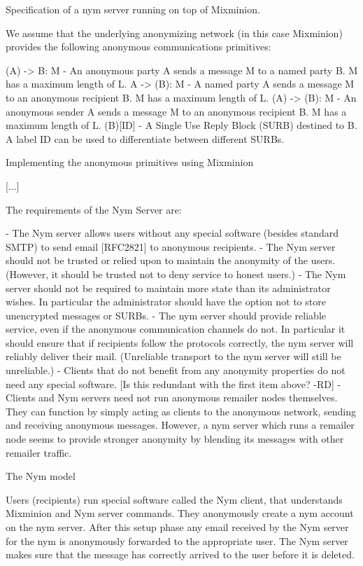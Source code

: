 Specification of a nym server running on top of Mixminion.

We assume that the underlying anonymizing network (in this case
Mixminion) provides the following anonymous communications
primitives:

(A) -> B: M   - An anonymous party A sends a message M to a named party
                B. M has a maximum length of L.
A -> (B): M   - A named party A sends a message M to an anonymous
                recipient B. M has a maximum length of L.
(A) -> (B): M - An anonymous sender A sends a message M to an
                anonymous recipient B. M has a maximum length of L.
(B)[ID]       - A Single Use Reply Block (SURB) destined to B. A label
                ID can be used to differentiate between different
                SURBs.

Implementing the anonymous primitives using Mixminion

[...]

The requirements of the Nym Server are:

- The Nym server allows users without any special software (besides
  standard SMTP) to send email [RFC2821] to anonymous recipients.
- The Nym server should not be trusted or relied upon to maintain the
  anonymity of the users. (However, it should be trusted not to deny
  service to honest users.)
- The Nym server should not be required to maintain more state than
  its administrator wishes. In particular the administrator should
  have the option not to store unencrypted messages or SURBs.
- The nym server should provide reliable service, even if the
  anonymous communication channels do not. In particular it should
  ensure that if recipients follow the protocols correctly, the nym
  server will reliably deliver their mail. (Unreliable transport to
  the nym server will still be unreliable.)
- Clients that do not benefit from any anonymity properties do not
  need any special software.
[Is this redundant with the first item above? -RD]
- Clients and Nym servers need not run anonymous remailer nodes
  themselves. They can function by simply acting as clients to the
  anonymous network, sending and receiving anonymous messages. However,
  a nym server which runs a remailer node seems to provide stronger
  anonymity by blending its messages with other remailer traffic.


The Nym model

Users (recipients) run special software called the Nym client, that
understands Mixminion and Nym server commands. They anonymously create
a nym account on the nym server. After this setup phase any email
received by the Nym server for the nym is anonymously forwarded to
the appropriate user. The Nym server makes sure that the message has
correctly arrived to the user before it is deleted.

